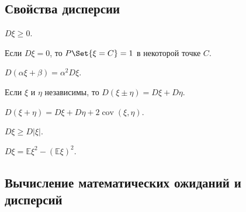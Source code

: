 \subsection{Свойства дисперсии}

\begin{props}
\item $ D\xi \ge 0 $.
\item Если $ D \xi = 0 $, то $ P\Set{\xi = C} = 1 $ в некоторой точке $ C $.
\item $ D(\alpha \xi + \beta) = \alpha^2 D\xi $.
\item Если $ \xi $ и $ \eta $ независимы, то $ D(\xi \pm \eta) = D\xi + D\eta $.
\item $ D(\xi + \eta) = D\xi + D\eta + 2 \operatorname{cov}(\xi, \eta) $.
\item $ D\xi \ge D|\xi| $.
\item $ D \xi = \mathbb E\xi^2 - (\mathbb E \xi)^2 $.
\end{props}

\subsection{Вычисление математических ожиданий и дисперсий}

